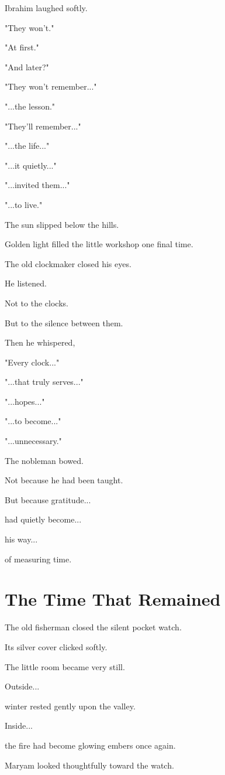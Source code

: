 \documentclass[12pt,openany]{book}
\begin{document}
Ibrahim laughed softly.

"They won't."

"At first."

"And later?"

"They won't remember..."

"...the lesson."

"They'll remember..."

"...the life..."

"...it quietly..."

"...invited them..."

"...to live."

The sun slipped below the hills.

Golden light filled the little workshop one final time.

The old clockmaker closed his eyes.

He listened.

Not to the clocks.

But to the silence between them.

Then he whispered,

"Every clock..."

"...that truly serves..."

"...hopes..."

"...to become..."

"...unnecessary."

The nobleman bowed.

Not because he had been taught.

But because gratitude...

had quietly become...

his way...

of measuring time.
\section*{The Time That Remained}

The old fisherman closed the silent pocket watch.

Its silver cover clicked softly.

The little room became very still.

Outside...

winter rested gently upon the valley.

Inside...

the fire had become glowing embers once again.

Maryam looked thoughtfully toward the watch.
\end{document}
